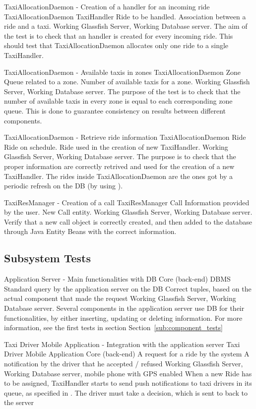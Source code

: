 \testx
{TaxiAllocationDaemon - Creation of a handler for an incoming ride}
{TaxiAllocationDaemon}
{TaxiHandler}
{Ride to be handled.}
{Association between a ride and a taxi.}
{Working Glassfish Server, Working Database server.}
{The aim of the test is to check that an handler is created for every incoming
ride. This should test that TaxiAllocationDaemon allocates only one ride to a single TaxiHandler.}

\testx
{TaxiAllocationDaemon - Available taxis in zones}
{TaxiAllocationDaemon}
{Zone}
{Queue related to a zone.}
{Number of available taxis for a zone.}
{Working Glassfish Server, Working Database server.}
{The purpose of the test is to check that the number of available taxis in every
zone is equal to each corresponding zone queue. This is done to guarantee consistency on results between different components.}

\testx
{TaxiAllocationDaemon - Retrieve ride information}
{TaxiAllocationDaemon}
{Ride}
{Ride on schedule.}
{Ride used in the creation of new TaxiHandler.}
{Working Glassfish Server, Working Database server.}
{The purpose is to check that the proper information are correctly retrived and
used for the creation of a new TaxiHandler. The rides inside TaxiAllocationDaemon are the ones got by a periodic refresh on the DB (by using ).}

\testx
{TaxiResManager - Creation of a call}
{TaxiResManager}
{Call}
{Information provided by the user.}
{New Call entity.}
{Working Glassfish Server, Working Database server.}
{Verify that a new call object is correctly created, and then added to the database through Java Entity Beans with the correct information.}

\subsection{Subsystem Tests} %
\label{sub:subsystem_tests}

\testx
{Application Server - Main functionalities with DB}
{Core (back-end)}
{DBMS}
{Standard query by the application server on the DB}
{Correct tuples, based on the actual component that made the request}
{Working Glassfish Server, Working Database server.}
{Several components in the application server use DB for their functionalities, by either inserting, updating or deleting information. For more information, see the first tests in section Section~\ref{sub:component_tests}}

\testx
{Taxi Driver Mobile Application - Integration with the application server}
{Taxi Driver Mobile Application}
{Core (back-end)}
{A request for a ride by the system}
{A notification by the driver that he accepted / refused}
{Working Glassfish Server, Working Database server, mobile phone with GPS enabled}
{When a new Ride has to be assigned, TaxiHandler starts to send push notifications to taxi drivers in its queue, as specified in \cite[p.~22]{bib:dd}. The driver must take a decision, which is sent to back to the server}

